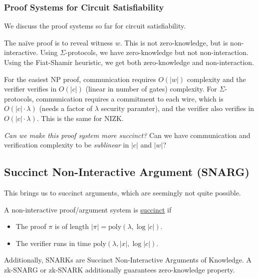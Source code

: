 \subsubsection{Proof Systems for Circuit Satisfiability}
We discuss the proof systems so far for circuit satisfiability.


The na\"ive proof is to reveal witness $w$. This is not zero-knowledge, but is non-interactive. Using $\Sigma$-protocols, we have zero-knowledge but not non-interaction. Using the Fiat-Shamir heuristic, we get both zero-knowledge and non-interaction.

For the easiest \textsf{NP} proof, communication requires $O(|w|)$ complexity and the verifier verifies in $O(|c|)$ (linear in number of gates) complexity. For $\Sigma$-protocols, communication requires a commitment to each wire, which is $O(|c|\cdot \lambda)$ (needs a factor of $\lambda$ security paramter), and the verifier also verifies in $O(|c|\cdot \lambda)$. This is the same for NIZK.

\emph{Can we make this proof system more succinct?} Can we have communication and verification complexity to be \emph{sublinear} in $|c|$ and $|w|$?

\subsection{Succinct Non-Interactive Argument (SNARG)}
This brings us to succinct arguments, which are seemingly not quite possible.
\begin{definition}
    A non-interactive proof/argument system is \ul{succinct} if
    \begin{itemize}
        \item The proof $\pi$ is of length $|\pi| = \mathrm{poly}(\lambda, \log |c|)$.
        \item The verifier runs in time $\mathrm{poly}(\lambda, |x|, \log|c|)$.
    \end{itemize}
\end{definition}
Additionally, SNARKs are Succinct Non-Interactive Arguments of Knowledge. A zk-SNARG or zk-SNARK additionally guarantees zero-knowledge property.

